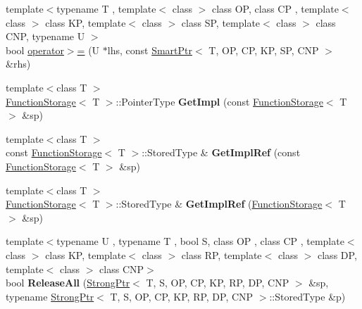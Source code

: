 \begin{DoxyCompactItemize}
\item 
{\footnotesize template$<$typename T , template$<$ class $>$ class O\+P, class C\+P , template$<$ class $>$ class K\+P, template$<$ class $>$ class S\+P, template$<$ class $>$ class C\+N\+P, typename U $>$ }\\bool \hyperlink{group__SmartPointerGroup_ga21e42b6dac17e9ce23d32c7a9309b09c}{operator$>$=} (U $\ast$lhs, const \hyperlink{classLoki_1_1SmartPtr}{Smart\+Ptr}$<$ T, O\+P, C\+P, K\+P, S\+P, C\+N\+P $>$ \&rhs)
\item 
\hypertarget{namespaceLoki_ab72ac925069e66352adca148451e8d5d}{}{\footnotesize template$<$class T $>$ }\\\hyperlink{classLoki_1_1FunctionStorage}{Function\+Storage}$<$ T $>$\+::Pointer\+Type {\bfseries Get\+Impl} (const \hyperlink{classLoki_1_1FunctionStorage}{Function\+Storage}$<$ T $>$ \&sp)\label{namespaceLoki_ab72ac925069e66352adca148451e8d5d}

\item 
\hypertarget{namespaceLoki_ad971a5cbde4a54b48c54f2f5784d821b}{}{\footnotesize template$<$class T $>$ }\\const \hyperlink{classLoki_1_1FunctionStorage}{Function\+Storage}$<$ T $>$\+::Stored\+Type \& {\bfseries Get\+Impl\+Ref} (const \hyperlink{classLoki_1_1FunctionStorage}{Function\+Storage}$<$ T $>$ \&sp)\label{namespaceLoki_ad971a5cbde4a54b48c54f2f5784d821b}

\item 
\hypertarget{namespaceLoki_ad420579370b69cb4cd4a84a22f668cd6}{}{\footnotesize template$<$class T $>$ }\\\hyperlink{classLoki_1_1FunctionStorage}{Function\+Storage}$<$ T $>$\+::Stored\+Type \& {\bfseries Get\+Impl\+Ref} (\hyperlink{classLoki_1_1FunctionStorage}{Function\+Storage}$<$ T $>$ \&sp)\label{namespaceLoki_ad420579370b69cb4cd4a84a22f668cd6}

\item 
\hypertarget{namespaceLoki_a7532d2b589bb15274dfcefbcecb5a01e}{}{\footnotesize template$<$typename U , typename T , bool S, class O\+P , class C\+P , template$<$ class $>$ class K\+P, template$<$ class $>$ class R\+P, template$<$ class $>$ class D\+P, template$<$ class $>$ class C\+N\+P$>$ }\\bool {\bfseries Release\+All} (\hyperlink{classLoki_1_1StrongPtr}{Strong\+Ptr}$<$ T, S, O\+P, C\+P, K\+P, R\+P, D\+P, C\+N\+P $>$ \&sp, typename \hyperlink{classLoki_1_1StrongPtr}{Strong\+Ptr}$<$ T, S, O\+P, C\+P, K\+P, R\+P, D\+P, C\+N\+P $>$\+::Stored\+Type \&p)\label{namespaceLoki_a7532d2b589bb15274dfcefbcecb5a01e}


\end{DoxyCompactItemize}
